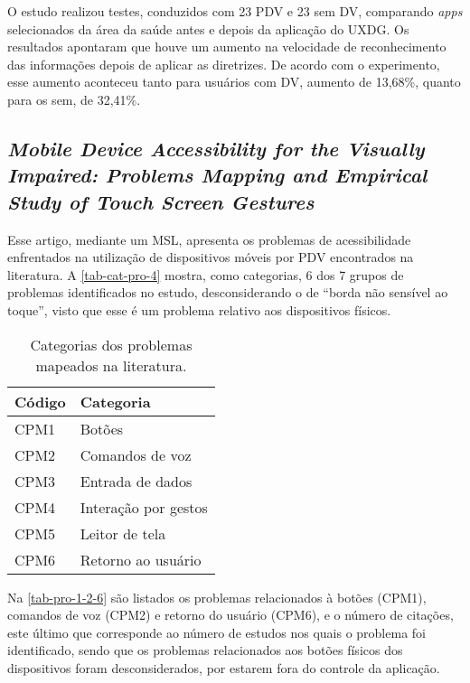 O estudo realizou testes, conduzidos com 23 PDV e 23 sem DV, comparando \emph{apps} selecionados da área da saúde antes e depois da aplicação do UXDG\@.
Os resultados apontaram que houve um aumento na velocidade de reconhecimento das informações depois de aplicar as diretrizes.
De acordo com o experimento, esse aumento aconteceu tanto para usuários com DV, aumento de 13,68\%, quanto para os sem, de 32,41\%.

\subsection{\emph{Mobile Device Accessibility for the Visually Impaired: Problems Mapping and Empirical Study of Touch Screen Gestures}}

Esse artigo, mediante um MSL, apresenta os problemas de acessibilidade enfrentados na utilização de dispositivos móveis por PDV encontrados na literatura.
A \autoref{tab-cat-pro-4} mostra, como categorias, 6 dos 7 grupos de problemas identificados no estudo,
desconsiderando o de ``borda não sensível ao toque'', visto que esse é um problema relativo aos dispositivos físicos.

\begin{table}[htb]
  \begin{center}
    \ABNTEXfontereduzida
    \caption{Categorias dos problemas mapeados na literatura.}
    \label{tab-cat-pro-4}
    \begin{tabular}{p{2.0cm}|p{5.0cm}}
      \textbf{Código} & \textbf{Categoria}   \\
      \hline
      CPM1            & Botões               \\
      \hline
      CPM2            & Comandos de voz      \\
      \hline
      CPM3            & Entrada de dados     \\
      \hline
      CPM4            & Interação por gestos \\
      \hline
      CPM5            & Leitor de tela       \\
      \hline
      CPM6            & Retorno ao usuário   \\
    \end{tabular}
  \end{center}
\end{table}

Na \autoref{tab-pro-1-2-6} são listados os problemas relacionados à botões (CPM1), comandos de voz (CPM2) e retorno do usuário (CPM6),
e o número de citações, este último que corresponde ao número de estudos nos quais o problema foi identificado, sendo que os problemas
relacionados aos botões físicos dos dispositivos foram desconsiderados, por estarem fora do controle da aplicação.

